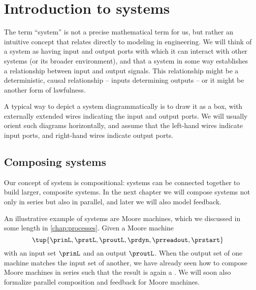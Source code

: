 
\section{Introduction to systems}


The term ``system'' is not a precise mathematical term for us, but rather an intuitive concept that relates directly to modeling in engineering.
We will think of a system as having input and output ports with which it can interact with other systems (or its broader environment), and that a system in some way establishes a relationship between input and output signals.
This relationship might be a deterministic, causal relationship -- inputs determining outputs -- or it might be another form of lawfulness.

A typical way to depict a system diagrammatically is to draw it as a box, with externally extended wires indicating the input and output ports.
We will usually orient such diagrams horizontally, and assume that the left-hand wires indicate input ports, and right-hand wires indicate output ports.


\subsection{Composing systems}

Our concept of system is compositional: systems can be connected together to build larger, composite systems.
In the next chapter we will compose systems not only in series but also in parallel, and later we will also model feedback.

An illustrative example of systems are Moore machines, which we discussed in some length in \cref{chap:processes}.
Given a Moore machine
\begin{equation}
    \label{eq:moore-machine-specification}
    \tup{\prinL,\prstL,\proutL,\prdyn,\prreadout,\prstart}
\end{equation}
with an input set $\prinL$ and an output $\proutL$.
When the output set of one machine matches the input set of another, we have already seen how to compose Moore machines in series such that the result is again a .
We will soon also formalize parallel composition and feedback for Moore machines.

